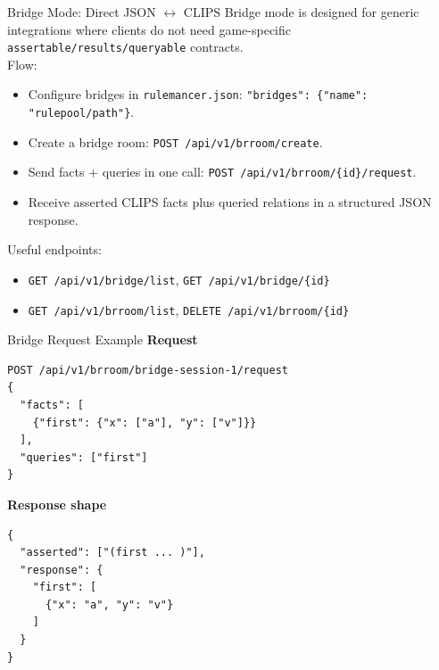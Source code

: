 \documentclass[aspectratio=169]{beamer}
\begin{document}
\begin{frame}{Bridge Mode: Direct JSON $\leftrightarrow$ CLIPS}
Bridge mode is designed for generic integrations where clients do not need game-specific
\texttt{assertable/results/queryable} contracts.\\
\vspace{0.3cm}
Flow:
\begin{itemize}
  \item Configure bridges in \texttt{rulemancer.json}: \texttt{"bridges": \{"name": "rulepool/path"\}}.
  \item Create a bridge room: \texttt{POST /api/v1/brroom/create}.
  \item Send facts + queries in one call: \texttt{POST /api/v1/brroom/\{id\}/request}.
  \item Receive asserted CLIPS facts plus queried relations in a structured JSON response.
\end{itemize}
\vspace{0.3cm}
Useful endpoints:
\begin{itemize}
  \item \texttt{GET /api/v1/bridge/list}, \texttt{GET /api/v1/bridge/\{id\}}
  \item \texttt{GET /api/v1/brroom/list}, \texttt{DELETE /api/v1/brroom/\{id\}}
\end{itemize}
\end{frame}

\begin{frame}[fragile]{Bridge Request Example}
\textbf{Request}
\begin{verbatim}
POST /api/v1/brroom/bridge-session-1/request
{
  "facts": [
    {"first": {"x": ["a"], "y": ["v"]}}
  ],
  "queries": ["first"]
}
\end{verbatim}

\textbf{Response shape}
\begin{verbatim}
{
  "asserted": ["(first ... )"],
  "response": {
    "first": [
      {"x": "a", "y": "v"}
    ]
  }
}
\end{verbatim}
\end{frame}
\end{document}
